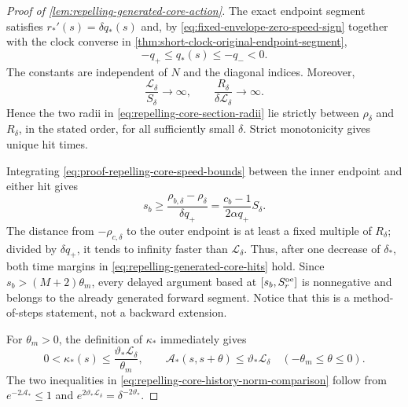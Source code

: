 \begin{proof}[Proof of \cref{lem:repelling-generated-core-action}]
The exact endpoint segment satisfies
\(r_*'(s)=\delta q_*(s)\) and, by
\cref{eq:fixed-envelope-zero-speed-sign} together with the clock
converse in \cref{thm:short-clock-original-endpoint-segment},
\begin{equation}
 -q_+\le q_*(s)\le-q_-<0.                       \label{eq:proof-repelling-core-speed-bounds}
\end{equation}
The constants are independent of \(N\) and the diagonal indices.  Moreover,
\begin{equation}
 \frac{\mathscr L_\delta}{S_\delta}\longrightarrow\infty,
 \qquad
 \frac{R_\delta}{\delta\mathscr L_\delta}\longrightarrow\infty.   \label{eq:proof-repelling-core-scale-separation}
\end{equation}
Hence the two radii in
\cref{eq:repelling-core-section-radii} lie strictly between
\(\rho_\delta\) and \(R_\delta\), in the stated order, for all sufficiently
small \(\delta\).  Strict monotonicity gives unique hit times.

Integrating \cref{eq:proof-repelling-core-speed-bounds} between the inner
endpoint and either hit gives
\begin{equation}
 s_b\ge
 \frac{\rho_{b,\delta}-\rho_\delta}{\delta q_+}
 =\frac{c_b-1}{2\alpha q_+}S_\delta.             \label{eq:proof-repelling-core-entry-time}
\end{equation}
The distance from \(-\rho_{c,\delta}\) to the outer endpoint is at least
a fixed multiple of \(R_\delta\); divided by \(\delta q_+\), it tends to
infinity faster than \(\mathscr L_\delta\).  Thus, after one decrease of
\(\delta_*\), both time margins in
\cref{eq:repelling-generated-core-hits} hold.  Since
\(s_b>(M+2)\theta_m\), every delayed argument based at
\([s_b,S_r^{\rm oe}]\) is nonnegative and belongs to the already generated forward
segment.  Notice that this is a method-of-steps statement, not a backward
extension.

For \(\theta_m>0\), the definition of \(\kappa_*\) immediately gives
\begin{equation}
 0<\kappa_*(s)\le\frac{\vartheta_*\mathscr L_\delta}{\theta_m},
 \qquad
 \mathscr A_*(s,s+\theta)\le\vartheta_*\mathscr L_\delta
 \quad(-\theta_m\le\theta\le0).                 \label{eq:proof-repelling-core-one-delay-action}
\end{equation}
The two inequalities in
\cref{eq:repelling-core-history-norm-comparison} follow from
\(e^{-2\mathscr A_*}\le1\) and
\(e^{2\vartheta_*\mathscr L_\delta}=\delta^{-2\vartheta_*}\).


\end{proof}
